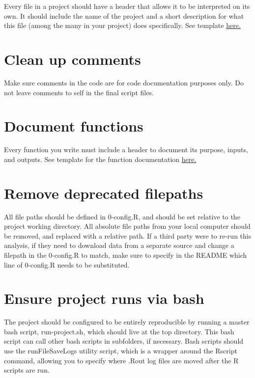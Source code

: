 \documentclass[
]{book}
\begin{document}
Every file in a project should have a header that allows it to be interpreted on its own. It should include the name of the project and a short description for what this file (among the many in your project) does specifically. See template \href{https://jadebc.github.io/lab-manual/coding-practices.html\#file-headers}{here.}

\hypertarget{clean-up-comments}{%
\section{Clean up comments}\label{clean-up-comments}}

Make sure comments in the code are for code documentation purposes only. Do not leave comments to self in the final script files.

\hypertarget{document-functions}{%
\section{Document functions}\label{document-functions}}

Every function you write must include a header to document its purpose, inputs, and outputs. See template for the function documentation \href{https://jadebc.github.io/lab-manual/coding-practices.html\#function-documentation}{here.}

\hypertarget{remove-deprecated-filepaths}{%
\section{Remove deprecated filepaths}\label{remove-deprecated-filepaths}}

All file paths should be defined in 0-config.R, and should be set relative to the project working directory. All absolute file paths from your local computer should be removed, and replaced with a relative path. If a third party were to re-run this analysis, if they need to download data from a separate source and change a filepath in the 0-config.R to match, make sure to specify in the README which line of 0-config.R needs to be substituted.

\hypertarget{ensure-project-runs-via-bash}{%
\section{Ensure project runs via bash}\label{ensure-project-runs-via-bash}}

The project should be configured to be entirely reproducible by running a master bash script, run-project.sh, which should live at the top directory. This bash script can call other bash scripts in subfolders, if necessary. Bash scripts should use the runFileSaveLogs utility script, which is a wrapper around the Rscript command, allowing you to specify where .Rout log files are moved after the R scripts are run.
\end{document}
